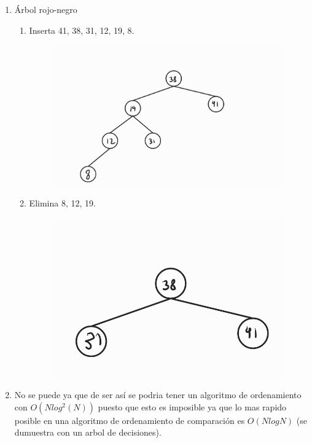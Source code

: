 \documentclass[letterpaper]{article}
\theoremstyle{definition}
\theoremstyle{lemathm}
\theoremstyle{lemademthm}
\begin{document}
\begin{enumerate}
		\item Árbol rojo-negro
		
		\begin{enumerate}
			\item Inserta 41, 38, 31, 12, 19, 8.
			
				\begin{figure}[H]
					\centering
					\includegraphics[scale=.25]{images/arbol2}
				\end{figure}

			\item Elimina 8, 12, 19.
			
				\begin{figure}[H]
					\centering
					\includegraphics[scale=.25]{images/arbol3}
				\end{figure}

		\end{enumerate}

		\item No se puede ya que de ser así se podria tener un algoritmo de ordenamiento con \linebreak $O(Nlog^2(N))$ puesto que esto es imposible ya que lo mas rapido posible en una algoritmo de ordenamiento de comparación es $O(NlogN)$ (se dumuestra con un arbol de decisiones).
		

\end{enumerate}
\end{document}
